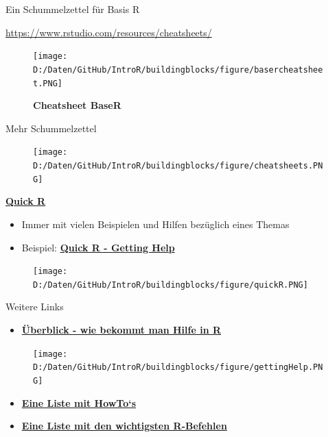 \documentclass[ignorenonframetext,]{beamer}
\providecommand{\tightlist}{%
  \setlength{\itemsep}{0pt}\setlength{\parskip}{0pt}}
\begin{document}
\begin{frame}{Ein Schummelzettel für Basis R}

\url{https://www.rstudio.com/resources/cheatsheets/}

\begin{figure}
\centering
\texttt{[image: D:/Daten/GitHub/IntroR/buildingblocks/figure/basercheatsheet.PNG]}
\caption{\textbf{Cheatsheet BaseR}}
\end{figure}

\end{frame}

\begin{frame}{Mehr Schummelzettel}

\begin{figure}
\centering
\texttt{[image: D:/Daten/GitHub/IntroR/buildingblocks/figure/cheatsheets.PNG]}
\caption{}
\end{figure}

\end{frame}

\begin{frame}{\href{http://www.statmethods.net/interface/help.html}{\textbf{Quick
R}}}

\begin{itemize}
\tightlist
\item
  Immer mit vielen Beispielen und Hilfen bezüglich eines Themas
\item
  Beispiel:
  \href{http://www.statmethods.net/interface/help.html}{\textbf{Quick R
  - Getting Help}}
\end{itemize}

\begin{figure}
\centering
\texttt{[image: D:/Daten/GitHub/IntroR/buildingblocks/figure/quickR.PNG]}
\caption{}
\end{figure}

\end{frame}

\begin{frame}{Weitere Links}

\begin{itemize}
\tightlist
\item
  \href{https://www.r-project.org/help.html}{\textbf{Überblick - wie
  bekommt man Hilfe in R}}
\end{itemize}

\begin{figure}
\centering
\texttt{[image: D:/Daten/GitHub/IntroR/buildingblocks/figure/gettingHelp.PNG]}
\caption{}
\end{figure}

\begin{itemize}
\item
  \href{http://rprogramming.net/}{\textbf{Eine Liste mit HowTo`s}}
\item
  \href{https://www.personality-project.org/r/r.commands.html}{\textbf{Eine
  Liste mit den wichtigsten R-Befehlen}}
\end{itemize}

\end{frame}
\end{document}
